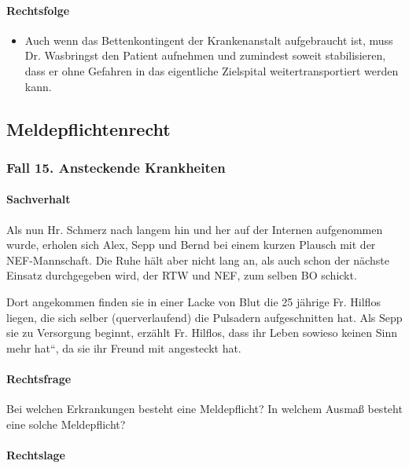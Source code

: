 \paragraph*{Rechtsfolge}

\begin{itemize}

	\item {\mdseries\color[rgb]{0.0,0.0,0.5019608}
	Auch wenn das Bettenkontingent der Krankenanstalt aufgebraucht ist, muss Dr.
	Wasbringst den Patient aufnehmen und zumindest soweit stabilisieren, dass
	er ohne Gefahren in das eigentliche Zielspital weitertransportiert
	werden kann.}

\end{itemize}

\subsection{Meldepflichtenrecht}

\subsubsection{Fall 15. Ansteckende Krankheiten}

\paragraph*{Sachverhalt}

Als nun Hr. Schmerz nach langem hin und her auf der Internen aufgenommen
wurde, erholen sich Alex, Sepp und Bernd bei einem kurzen Plausch mit
der NEF-Mannschaft. Die Ruhe hält aber nicht lang an, als auch schon
der nächste Einsatz durchgegeben wird, der RTW und NEF,
zum selben BO schickt. 

Dort angekommen finden sie in einer Lacke von Blut die 25 jährige Fr.
Hilflos liegen, die sich selber (querverlaufend) die Pulsadern
aufgeschnitten hat. Als Sepp sie zu Versorgung beginnt, erzählt Fr.
Hilflos, dass ihr Leben {\quotedblbase}sowieso keinen Sinn mehr
hat{\textquotedblleft}, da sie ihr Freund mit  angesteckt hat.

\paragraph*{Rechtsfrage}

Bei welchen Erkrankungen besteht eine Meldepflicht? In welchem
Ausma{\ss} besteht eine solche Meldepflicht?

\paragraph*{Rechtslage}


